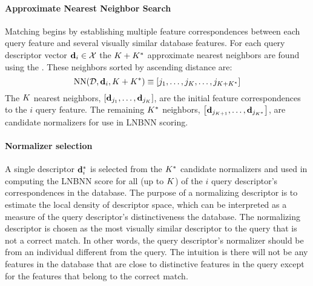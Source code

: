         \paragraph{Approximate Nearest Neighbor Search}

            Matching begins by establishing multiple feature correspondences between each query feature and
              several visually similar database features.
            For each query descriptor vector $\mathbf{d}_i \in \mathcal{X}$ the $K + K^{*}$ approximate nearest neighbors are
              found using the .
            These neighbors sorted by ascending distance are:
            \begin{equation}
                \operatorname{NN}(\mathcal{D}, \mathbf{d}_i, K + K^{*}) \equiv \left[j_1{}, \ldots{}, j_{K}, \ldots, j_{K + K^{*}}\right]
            \end{equation}
            The $K$ nearest neighbors, $\left[\mathbf{d}_{{j_1}}, \ldots{}, \mathbf{d}_{{j_{K}}}\right]$, are the initial feature
              correspondences to the $i$\th{} query feature.
            The remaining $K^{*}$ neighbors, $\left[\mathbf{d}_{{j_{K + 1}}}, \ldots{}, \mathbf{d}_{j_{K^{*}}}\right]$, are candidate
              normalizers for use in LNBNN scoring.

        \paragraph{Normalizer selection}
            A single descriptor $\mathbf{d}^{*}_{i}$ is selected from the $K^{*}{}$ candidate normalizers and used in
              computing the LNBNN score for all (up to $K$) of the $i$\th{} query descriptor's correspondences in
              the database.
            The purpose of a normalizing descriptor is to estimate the local density of descriptor space, which
              can be interpreted as a measure of the query descriptor's distinctiveness \wrt{} the database.
            The normalizing descriptor is chosen as the most visually similar descriptor to the query that is not
              a correct match.
            In other words, the query descriptor's normalizer should be from an individual different from the
              query.
            The intuition is there will not be any features in the database that are close to distinctive
              features in the query except for the features that belong to the correct match.

